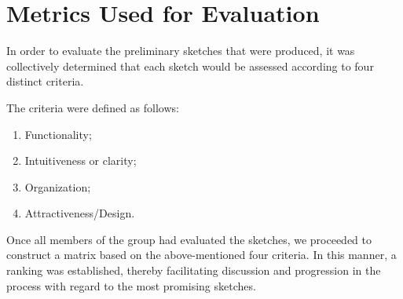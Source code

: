 \section{Metrics Used for Evaluation}
In order to evaluate the preliminary sketches that were produced, it was
collectively determined that each sketch would be assessed according to four
distinct criteria. \par 
The criteria were defined as follows:
\begin{enumerate}
    \item Functionality;
    \item Intuitiveness or clarity;
    \item Organization;
    \item Attractiveness/Design. 
\end{enumerate} \par 
Once all members of the group had evaluated the sketches, we proceeded to
construct a matrix based on the above-mentioned four criteria. In this manner, a
ranking was established, thereby facilitating discussion and progression in the
process with regard to the most promising sketches.
